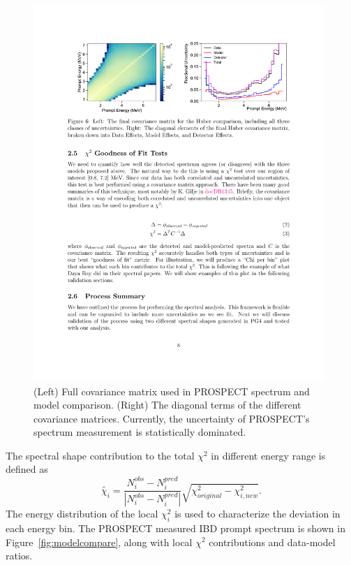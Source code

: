 \begin{figure}[h!]
    \centering
    \includegraphics[width=0.98\textwidth]{Figures/CovMatrix.pdf}
    \caption[Full covariance matrix for the PROSPECT spectrum analysis]{
    (Left) Full covariance matrix used in PROSPECT spectrum and model comparison.
    (Right) The diagonal terms of the different covariance matrices.
   	Currently, the uncertainty of PROSPECT's spectrum measurement is statistically dominated.}
    \label{fig:covs}
\end{figure}

The spectral shape contribution to the total $\chi^2$ in different energy range is defined as 
\begin{equation}
\widetilde{\chi_i} = \frac{N_i^{obs}-N_i^{pred}}{|N_i^{obs}-N_i^{pred}|} \sqrt{\chi^2_{original} - \chi^2_{i,new}}.
\end{equation}
The energy distribution of the local $\chi^2_i$ is used to characterize the deviation in each energy bin.
The PROSPECT measured IBD prompt spectrum is shown in Figure~\ref{fig:modelcompare}, along with local $\chi^2$ contributions and data-model ratios.

